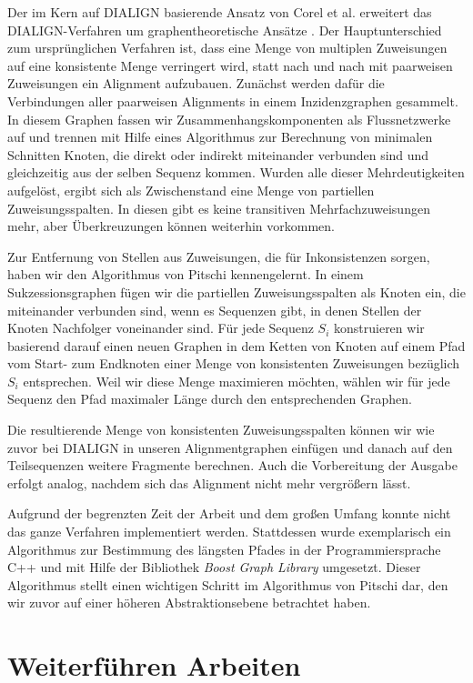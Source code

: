 Der im Kern auf DIALIGN basierende Ansatz von Corel et al. erweitert das DIALIGN-Verfahren um graphentheoretische Ansätze \cite{cpm10}. Der Hauptunterschied zum ursprünglichen Verfahren ist, dass eine Menge von multiplen Zuweisungen auf eine konsistente Menge verringert wird, statt nach und nach mit paarweisen Zuweisungen ein Alignment aufzubauen. Zunächst werden dafür die Verbindungen aller paarweisen Alignments in einem Inzidenzgraphen gesammelt. In diesem Graphen fassen wir Zusammenhangskomponenten als Flussnetzwerke auf und trennen mit Hilfe eines Algorithmus zur Berechnung von minimalen Schnitten Knoten, die direkt oder indirekt miteinander verbunden sind und gleichzeitig aus der selben Sequenz kommen. Wurden alle dieser Mehrdeutigkeiten aufgelöst, ergibt sich als Zwischenstand eine Menge von partiellen Zuweisungsspalten. In diesen gibt es keine transitiven Mehrfachzuweisungen mehr, aber Überkreuzungen können weiterhin vorkommen. 

Zur Entfernung von Stellen aus Zuweisungen, die für Inkonsistenzen sorgen, haben wir den Algorithmus von Pitschi kennengelernt. In einem Sukzessionsgraphen fügen wir die partiellen Zuweisungsspalten als Knoten ein, die miteinander verbunden sind, wenn es Sequenzen gibt, in denen Stellen der Knoten Nachfolger voneinander sind. Für jede Sequenz $S_i$ konstruieren wir basierend darauf einen neuen Graphen in dem Ketten von Knoten auf einem Pfad vom Start- zum Endknoten einer Menge von konsistenten Zuweisungen bezüglich $S_i$ entsprechen. Weil wir diese Menge maximieren möchten, wählen wir für jede Sequenz den Pfad maximaler Länge durch den entsprechenden Graphen.

Die resultierende Menge von konsistenten Zuweisungsspalten können wir wie zuvor bei DIALIGN in unseren Alignmentgraphen einfügen und danach auf den Teilsequenzen weitere Fragmente berechnen. Auch die Vorbereitung der Ausgabe erfolgt analog, nachdem sich das Alignment nicht mehr vergrößern lässt.

Aufgrund der begrenzten Zeit der Arbeit und dem großen Umfang konnte nicht das ganze Verfahren implementiert werden. Stattdessen wurde exemplarisch ein Algorithmus zur Bestimmung des längsten Pfades in der Programmiersprache C++ und mit Hilfe der Bibliothek \emph{Boost Graph Library} umgesetzt. Dieser Algorithmus stellt einen wichtigen Schritt im Algorithmus von Pitschi dar, den wir zuvor auf einer höheren Abstraktionsebene betrachtet haben. 

\section{Weiterführen Arbeiten} \label{sec:fut_work}

